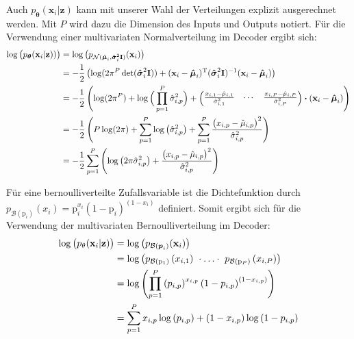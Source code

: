 \documentclass[12pt]{article}
\newcommand{\pdec}{p_{\boldsymbol\theta}(\mathbf{x}_i|\mathbf{z})}
\begin{document}
	Auch $\pdec$ kann mit unserer Wahl der Verteilungen explizit ausgerechnet werden.
	Mit $P$ wird dazu die Dimension des Inputs und Outputs notiert.
	Für die Verwendung einer multivariaten Normalverteilung im Decoder ergibt sich:
	\begin{align*}
	\log\big(\pdec)\big) &=  \log\big(p_{\mathcal{N}(\boldsymbol{\hat{\mu}}_{i},\boldsymbol{\hat{\sigma}}_{i}^{2}\textbf{I})}(\textbf{x}_{i})\big)\notag \\
	&= -\frac{1}{2}\left(\log(2\pi^{P} \det(\boldsymbol{\hat{\sigma}}_{i}^{2}\textbf{I}))+(\textbf{x}_{i}-\boldsymbol{\hat{\mu}}_{i})^{\mathrm{T}}(\boldsymbol{\hat{\sigma}}_{i}^{2}\textbf{I})^{-1}(\textbf{x}_{i}-\boldsymbol{\hat{\mu}}_{i})\right) \notag \\
	&= -\frac{1}{2}\left(\log(2\pi^{P})+\log\Big( \prod_{p=1}^{P}\hat{\sigma}_{i,p}^{2}\Big)+  \begin{pmatrix}  \frac{x_{i,1}-\hat{\mu}_{i,1}}{\hat{\sigma}_{i,1}^{2}}&\cdots& \frac{x_{i,P}-\hat{\mu}_{i,P}}{\hat{\sigma}_{i,P}^{2}}\end{pmatrix}
	\boldsymbol{\cdot}(\textbf{x}_{i}-\boldsymbol{\hat{\mu}}_{i})\right) \notag \\
	&= -\frac{1}{2}\left(P\log(2\pi)+\sum_{p=1}^{P}\log\left( \hat{\sigma}_{i,p}^{2}\right)+
	\sum_{p=1}^{P}\frac{\big(x_{i,p}-\hat{\mu}_{i,p}\big)^{2}}{\hat{\sigma}_{i,p}^{2}}\right) \notag \\
	&= -\frac{1}{2}\sum_{p=1}^{P} \left(\log\left(2\pi \hat{\sigma}_{i,p}^{2}\right) + \frac{\big(x_{i,p}-\hat{\mu}_{i,p}\big)^{2}}{\hat{\sigma}_{i,p}^{2}}\right)
	\end{align*}

	Für eine bernoulliverteilte Zufallsvariable ist die Dichtefunktion  durch $p_{\mathcal{B}(\mathrm{p}_{i})}(x_{i}) = \mathrm{p}_{i}^{x_{i}}(1-\mathrm{p}_{i})^{(1-x_{i})}$ definiert. Somit ergibt sich für die Verwendung der multivariaten Bernoulliverteilung im Decoder: \\
	\begin{align*}
	\log\big(p_{\theta}(\textbf{x}_{i}|\textbf{z})\big) &=  \log\big(p_{\mathcal{B}(\boldsymbol{p}_{i})}(\textbf{x}_{i})\big)\notag \\
	&= \log\left(p_{\mathcal{B}(\mathrm{p}_{1})}\left(x_{i,1}\right)\ \cdot\ldots\cdot \ p_{\mathcal{B}(\mathrm{p}_{P})}\left(x_{i,P}\right)\right)\notag \\
	&= \log\left(\prod_{p=1}^{P}\left(p_{i,p}\right)^{x_{i,p}}\left(1-p_{i,p}\right)^{\left(1-x_{i,p}\right)}\right) \notag \\
	&=  \sum_{p=1}^{P}x_{i,p}\log\left(p_{i,p}\right)+\left(1-x_{i,p}\right)\log\left(1-p_{i,p}\right)
	\end{align*}
\end{document}
